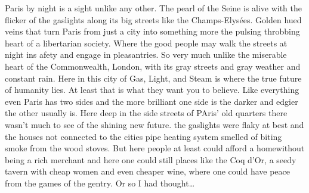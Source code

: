Paris by night is a sight unlike any other. The pearl of the Seine is alive with the flicker of the gaslights along its big streets like the Champs-Elys\'{e}es. Golden hued veins that turn Paris from just a city into something more the pulsing throbbing heart of a libertarian society. Where the good people may walk the streets at night ins afety and engage in pleasantries. So very much unlike the miserable heart of the Commonwealth, London, with its gray streets and gray weather and constant rain. Here in this city of Gas, Light, and Steam is where the true future of humanity lies. At least that is what they want you to believe. Like everything even Paris has two sides and the more brilliant one side is the darker and edgier the other usually is. Here deep in the side streets of PAris' old quarters there wasn't much to see of the shining new future. the gaslights were flaky at best and the houses not connected to the cities pipe heating system smelled of biting smoke from the wood stoves. But here people at least could afford a homewithout being a rich merchant and here one could still places like the Coq d'Or, a seedy tavern with cheap women and even cheaper wine, where one could have peace from the games of the gentry. Or so I had thought\dots

\newscene

